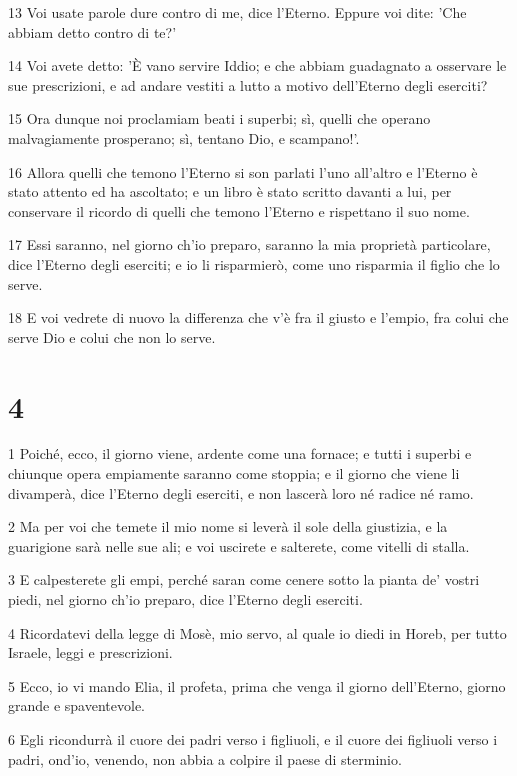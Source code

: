 \par 13 Voi usate parole dure contro di me, dice l'Eterno. Eppure voi dite: 'Che abbiam detto contro di te?'
\par 14 Voi avete detto: 'È vano servire Iddio; e che abbiam guadagnato a osservare le sue prescrizioni, e ad andare vestiti a lutto a motivo dell'Eterno degli eserciti?
\par 15 Ora dunque noi proclamiam beati i superbi; sì, quelli che operano malvagiamente prosperano; sì, tentano Dio, e scampano!'.
\par 16 Allora quelli che temono l'Eterno si son parlati l'uno all'altro e l'Eterno è stato attento ed ha ascoltato; e un libro è stato scritto davanti a lui, per conservare il ricordo di quelli che temono l'Eterno e rispettano il suo nome.
\par 17 Essi saranno, nel giorno ch'io preparo, saranno la mia proprietà particolare, dice l'Eterno degli eserciti; e io li risparmierò, come uno risparmia il figlio che lo serve.
\par 18 E voi vedrete di nuovo la differenza che v'è fra il giusto e l'empio, fra colui che serve Dio e colui che non lo serve.

\chapter{4}

\par 1 Poiché, ecco, il giorno viene, ardente come una fornace; e tutti i superbi e chiunque opera empiamente saranno come stoppia; e il giorno che viene li divamperà, dice l'Eterno degli eserciti, e non lascerà loro né radice né ramo.
\par 2 Ma per voi che temete il mio nome si leverà il sole della giustizia, e la guarigione sarà nelle sue ali; e voi uscirete e salterete, come vitelli di stalla.
\par 3 E calpesterete gli empi, perché saran come cenere sotto la pianta de' vostri piedi, nel giorno ch'io preparo, dice l'Eterno degli eserciti.
\par 4 Ricordatevi della legge di Mosè, mio servo, al quale io diedi in Horeb, per tutto Israele, leggi e prescrizioni.
\par 5 Ecco, io vi mando Elia, il profeta, prima che venga il giorno dell'Eterno, giorno grande e spaventevole.
\par 6 Egli ricondurrà il cuore dei padri verso i figliuoli, e il cuore dei figliuoli verso i padri, ond'io, venendo, non abbia a colpire il paese di sterminio.


